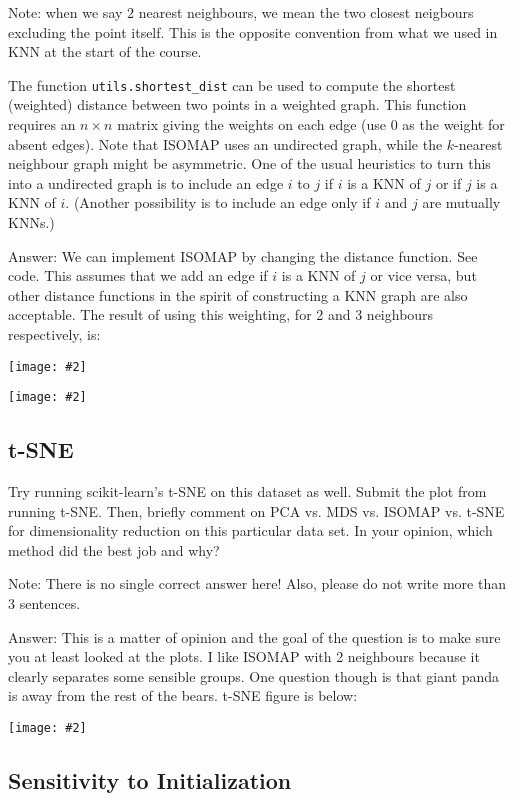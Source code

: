 \documentclass{article}
\def\ans#1{\par\gre{Answer: #1}}
\def\answer#1{\ans{#1}}
\def\blu#1{{\color{blu}#1}}
\def\gre#1{{\color{gre}#1}}
\newcommand{\centerfig}[2]{\begin{center}\texttt{[image: \#2]}\end{center}}
\begin{document}
Note: when we say $2$ nearest neighbours, we mean the two closest neigbours excluding the point itself. This is the opposite convention from what we used in KNN at the start of the course.

The function \texttt{utils.shortest\_dist} can be used to compute the shortest (weighted) distance between two points in a weighted graph.
This function requires an $n \times n$ matrix giving the weights on each edge (use $0$ as the weight for absent edges).
Note that ISOMAP uses an undirected graph, while the $k$-nearest neighbour graph might be asymmetric.
One of the usual heuristics to turn this into a undirected graph is to include an edge $i$ to $j$ if $i$ is a KNN of $j$ or if $j$ is a KNN of $i$.
(Another possibility is to include an edge only if $i$ and $j$ are mutually KNNs.)

\answer{
We can implement ISOMAP by changing the distance function. See code.
This assumes that we add an edge if $i$ is a KNN of $j$ or vice versa, but other distance functions in the spirit of constructing a KNN graph are also acceptable.
The result of using this weighting, for 2 and 3 neighbours respectively, is:
\centerfig{.5}{../figs/animals_isomap_features_2nn.png}
\centerfig{.5}{../figs/animals_isomap_features_3nn.png}
}


\subsection{t-SNE}

Try running scikit-learn's t-SNE on this dataset as well. \blu{Submit the plot from running t-SNE. Then, briefly comment on PCA vs. MDS vs. ISOMAP vs. t-SNE for dimensionality reduction on this particular data set. In your opinion, which method did the best job and why?}

Note: There is no single correct answer here! Also, please do not write more than 3 sentences.

\answer{This is a matter of opinion and the goal of the question is to make sure you at least looked at the plots.
I like ISOMAP with 2 neighbours because it clearly separates some sensible groups. One question though is that
giant panda is away from the rest of the bears. t-SNE figure is below:
\centerfig{.5}{../figs/TSNE_animals.png}
}


\subsection{Sensitivity to Initialization}
\end{document}

